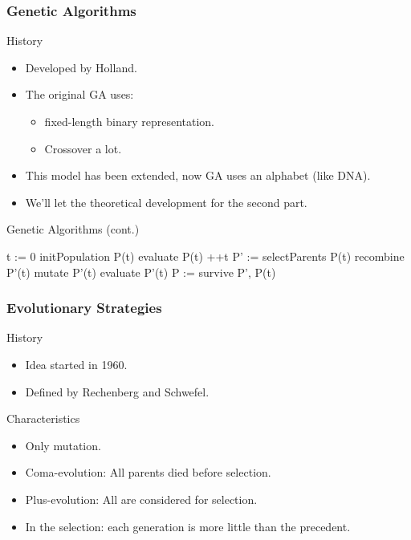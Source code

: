 \begin{frame}
  \frametitle{Genetic Algorithms}
  \begin{block}{History}
    \begin{itemize}
    \item Developed by Holland\cite{holland1992}.
    \item The original GA uses:
      \begin{itemize}
        \item fixed-length binary representation.
        \item Crossover a lot.
      \end{itemize}
    \item This model has been extended, now GA uses an alphabet (like DNA).
    \item We'll let the theoretical development for the second part.
    \end{itemize}
  \end{block}
\end{frame}

\begin{frame}{Genetic Algorithms (cont.)}
  \begin{algorithm}[H]
    \caption{Genetic Algorithm}
    \begin{algorithmic}
      \State t := 0
      \State initPopulation P(t)
      \State evaluate P(t)
        \State ++t
        \State P' := selectParents P(t)
        \State recombine P'(t)
        \State mutate P'(t)
        \State evaluate P'(t)
        \State P := survive P', P(t)
      \EndWhile
    \end{algorithmic}
  \end{algorithm}
\end{frame}

\begin{frame}
  \frametitle{Evolutionary Strategies}
  \begin{block}{History}
    \begin{itemize}
    \item Idea started in 1960.
    \item Defined by Rechenberg\cite{Rechenberg.1975} and Schwefel\cite{Schwefel.1981}.
    \end{itemize}
  \end{block}

  \begin{block}{Characteristics}
    \begin{itemize}
    \item Only mutation.
    \item Coma-evolution: All parents died before selection.
    \item Plus-evolution: All are considered for selection.
    \item In the selection: each generation is more little than the
      precedent.
    \end{itemize}
  \end{block}
\end{frame}


